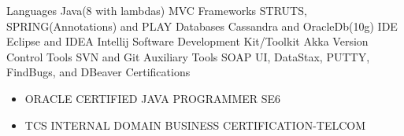 \begin{cvskills}
 \cvskill
 {Languages}
 { Java(8 with lambdas)}
 \cvskill
 {MVC Frameworks}
 { STRUTS, SPRING(Annotations) and PLAY}
 \cvskill
 {Databases}
 { Cassandra and OracleDb(10g)}
  \cvskill
 {IDE}
 { Eclipse and IDEA Intellij}
 \cvskill
 {Software Development Kit/Toolkit}
 { Akka}
 \cvskill
 {Version Control Tools}
 { SVN and Git}
  \cvskill
 {Auxiliary Tools}
 { SOAP UI,  DataStax, PUTTY, FindBugs, and DBeaver }
 \cvskill
 {Certifications}
 {\begin{itemize}
 \item ORACLE CERTIFIED JAVA PROGRAMMER SE6
 \end{itemize} 
 \begin{itemize}
 \item TCS INTERNAL DOMAIN BUSINESS CERTIFICATION-TELCOM
 \end{itemize}}
      \end{cvskills}
